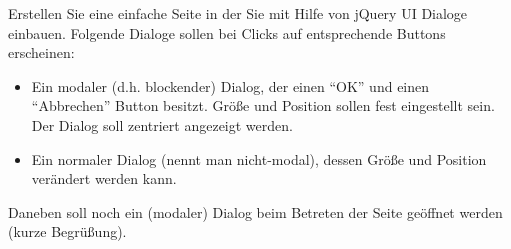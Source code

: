 %
\par Erstellen Sie eine einfache Seite in der Sie mit Hilfe von jQuery UI
Dialoge einbauen. Folgende Dialoge sollen bei Clicks auf entsprechende Buttons
erscheinen:
%
\begin{itemize}
\item
Ein modaler (d.h. blockender) Dialog, der einen ``OK'' und einen ``Abbrechen''
Button besitzt. Größe und Position sollen fest eingestellt sein. Der Dialog
soll zentriert angezeigt werden.
\item
Ein normaler Dialog (nennt man nicht-modal), dessen Größe und Position
verändert werden kann.
\end{itemize}
%
\par Daneben soll noch ein (modaler) Dialog beim Betreten der Seite geöffnet
werden (kurze Begrüßung).